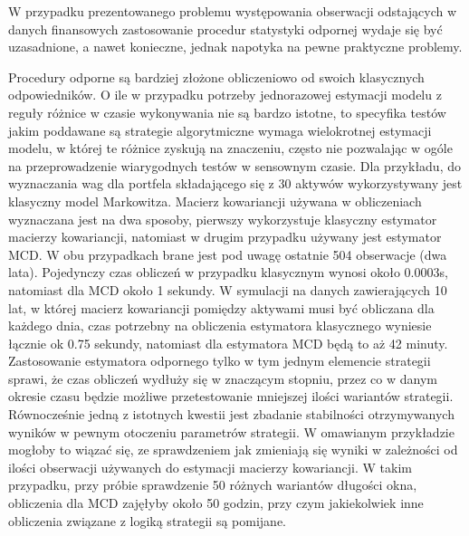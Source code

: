 \documentclass[a4paper,12pt,openany, DIV=calc, headsepline]{scrbook}
\begin{document}
W przypadku prezentowanego problemu występowania obserwacji odstających w danych finansowych zastosowanie procedur statystyki odpornej wydaje się być uzasadnione, a nawet konieczne, jednak napotyka na pewne praktyczne problemy.

Procedury odporne są bardziej złożone obliczeniowo od swoich klasycznych odpowiedników. O ile w przypadku potrzeby jednorazowej estymacji modelu z reguły różnice w czasie wykonywania nie są bardzo istotne, to specyfika testów jakim poddawane są strategie algorytmiczne wymaga wielokrotnej estymacji modelu, w której te różnice zyskują na znaczeniu, często nie pozwalając w ogóle na przeprowadzenie wiarygodnych testów w sensownym czasie. Dla przykładu, do wyznaczania wag dla portfela składającego się z 30 aktywów wykorzystywany jest klasyczny model Markowitza. Macierz kowariancji używana w obliczeniach wyznaczana jest na dwa sposoby, pierwszy wykorzystuje klasyczny estymator macierzy kowariancji, natomiast w drugim przypadku używany jest estymator MCD. W obu przypadkach brane jest pod uwagę ostatnie 504 obserwacje (dwa lata). Pojedynczy czas obliczeń w przypadku klasycznym wynosi około 0.0003s, natomiast dla MCD około 1 sekundy. W symulacji na danych zawierających 10 lat, w której macierz kowariancji pomiędzy aktywami musi być obliczana dla każdego dnia, czas potrzebny na obliczenia estymatora klasycznego wyniesie łącznie ok 0.75 sekundy, natomiast dla estymatora MCD będą to aż 42 minuty. Zastosowanie estymatora odpornego tylko w tym jednym elemencie strategii sprawi, że czas obliczeń wydłuży się w znaczącym stopniu, przez co w danym okresie czasu będzie możliwe przetestowanie mniejszej ilości wariantów strategii. Równocześnie jedną z istotnych kwestii jest zbadanie stabilności otrzymywanych wyników w pewnym otoczeniu parametrów strategii. W omawianym przykładzie mogłoby to wiązać się, ze sprawdzeniem jak zmieniają się wyniki w zależności od ilości obserwacji używanych do estymacji macierzy kowariancji. W takim przypadku, przy próbie sprawdzenie 50 różnych wariantów długości okna, obliczenia dla MCD zajęłyby około 50 godzin, przy czym jakiekolwiek inne obliczenia związane z logiką strategii są pomijane. 
\end{document}
